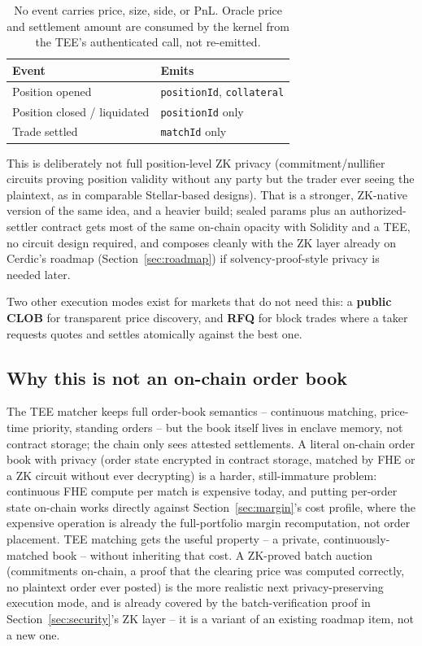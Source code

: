 \documentclass[11pt,a4paper]{article}
\begin{document}
\begin{table}[h]
  \centering
  \begin{tabular}{ll}
    \toprule
    \textbf{Event} & \textbf{Emits} \\
    \midrule
    Position opened & \texttt{positionId}, \texttt{collateral} \\
    Position closed / liquidated & \texttt{positionId} only \\
    Trade settled & \texttt{matchId} only \\
    \bottomrule
  \end{tabular}
  \caption{No event carries price, size, side, or PnL. Oracle price and settlement amount are consumed by the kernel from the TEE's authenticated call, not re-emitted.}
  \label{tab:events}
\end{table}

This is deliberately not full position-level ZK privacy (commitment/nullifier circuits proving position validity without any party but the trader ever seeing the plaintext, as in comparable Stellar-based designs). That is a stronger, ZK-native version of the same idea, and a heavier build; sealed params plus an authorized-settler contract gets most of the same on-chain opacity with Solidity and a TEE, no circuit design required, and composes cleanly with the ZK layer already on Cerdic's roadmap (Section~\ref{sec:roadmap}) if solvency-proof-style privacy is needed later.

Two other execution modes exist for markets that do not need this: a \textbf{public CLOB} for transparent price discovery, and \textbf{RFQ} for block trades where a taker requests quotes and settles atomically against the best one.

\subsection{Why this is not an on-chain order book}

The TEE matcher keeps full order-book semantics -- continuous matching, price-time priority, standing orders -- but the book itself lives in enclave memory, not contract storage; the chain only sees attested settlements. A literal on-chain order book with privacy (order state encrypted in contract storage, matched by FHE or a ZK circuit without ever decrypting) is a harder, still-immature problem: continuous FHE compute per match is expensive today, and putting per-order state on-chain works directly against Section~\ref{sec:margin}'s cost profile, where the expensive operation is already the full-portfolio margin recomputation, not order placement. TEE matching gets the useful property -- a private, continuously-matched book -- without inheriting that cost. A ZK-proved batch auction (commitments on-chain, a proof that the clearing price was computed correctly, no plaintext order ever posted) is the more realistic next privacy-preserving execution mode, and is already covered by the batch-verification proof in Section~\ref{sec:security}'s ZK layer -- it is a variant of an existing roadmap item, not a new one.
\end{document}
